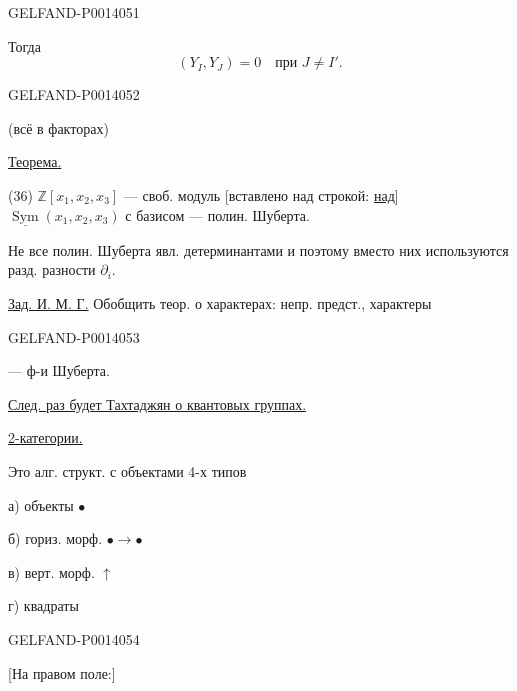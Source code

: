 \begin{GelfandAdjacentEvidence}{GELFAND-P001405}{1}

Тогда
\begin{equation*}
(Y_I,Y_J)=0\quad\text{при }J\ne I'. \tag{35}
\end{equation*}
\end{GelfandAdjacentEvidence}
\begin{GelfandAdjacentEvidence}{GELFAND-P001405}{2}

(всё в факторах)

\uline{Теорема.}

(36) \(\mathbb{Z}[x_1,x_2,x_3]\) — своб. модуль
[вставлено над строкой: \uline{над}]
\(\underline{\operatorname{Sym}}(x_1,x_2,x_3)\)
с базисом — полин. Шуберта.

Не все полин. Шуберта явл. детерминантами и поэтому вместо них используются разд. разности \(\partial_i\).

\uline{Зад. И. М. Г.} Обобщить теор. о характерах: непр. предст., характеры
\end{GelfandAdjacentEvidence}
\begin{GelfandAdjacentEvidence}{GELFAND-P001405}{3}

— ф-и Шуберта.

\uline{След. раз будет Тахтаджян о квантовых группах.}


\uline{2-категории.}

Это алг. структ. с объектами 4-х типов

а) объекты \(\bullet\)

б) гориз. морф. \(\bullet\longrightarrow\bullet\)

в) верт. морф. \(\uparrow\)

г) квадраты

\end{GelfandAdjacentEvidence}
\begin{GelfandAdjacentEvidence}{GELFAND-P001405}{4}


[На правом поле:]
\end{GelfandAdjacentEvidence}

